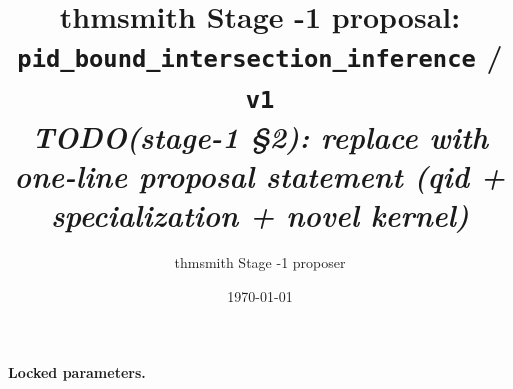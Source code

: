 \documentclass[11pt]{article}
\title{thmsmith Stage -1 proposal: \texttt{pid\_bound\_intersection\_inference} / \texttt{v1}%
  \\ \large\textit{TODO(stage-1 \S2): replace with one-line proposal statement (qid + specialization + novel kernel)}}
\author{thmsmith Stage -1 proposer}
\date{\today}
\theoremstyle{definition}
\theoremstyle{plain}
\theoremstyle{remark}
\begin{document}
\maketitle


\paragraph{Locked parameters.}

\begin{abstract}
\end{abstract}
\end{document}

